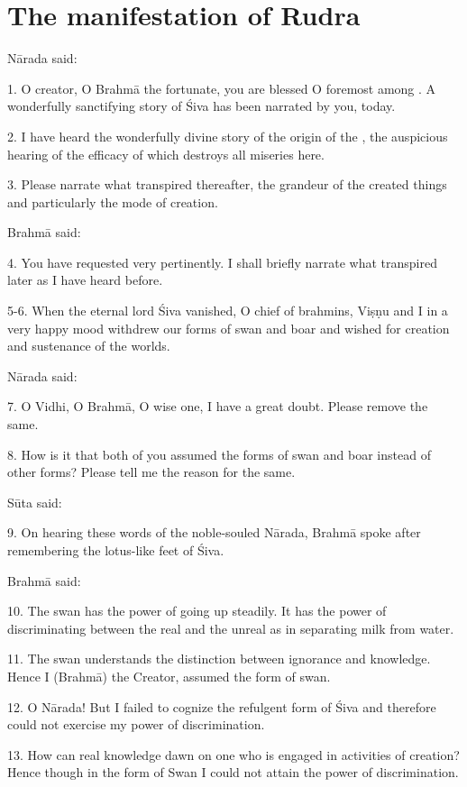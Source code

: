 \chapter{The manifestation of Rudra}

Nārada said:

1. O creator, O Brahmā the fortunate, you are blessed O foremost among .
A wonderfully sanctifying story of Śiva has been narrated by you, today.

2. I have heard the wonderfully divine story of the origin of the ,
the auspicious hearing of the efficacy of which destroys all miseries here.

3. Please narrate what transpired thereafter, the grandeur of the created things
and particularly the mode of creation.

Brahmā said:

4. You have requested very pertinently. I shall briefly narrate what transpired
later as I have heard before.

5-6. When the eternal lord Śiva vanished, O chief of brahmins, Viṣṇu and I in
a very happy mood withdrew our forms of swan and boar and wished for creation
and sustenance of the worlds.

Nārada said:

7. O Vidhi, O Brahmā, O wise one, I have a great doubt. Please remove the same.

8. How is it that both of you assumed the forms of swan and boar instead of
other forms? Please tell me the reason for the same.

Sūta said:

9. On hearing these words of the noble-souled Nārada, Brahmā spoke after
remembering the lotus-like feet of Śiva.

Brahmā said:

10. The swan has the power of going up steadily. It has the power of
discriminating between the real and the unreal as in separating milk from water.

11. The swan understands the distinction between ignorance and knowledge. Hence
I (Brahmā) the Creator, assumed the form of swan.

12. O Nārada! But I failed to cognize the refulgent form of Śiva and therefore
could not exercise my power of discrimination.

13. How can real knowledge dawn on one who is engaged in activities of creation?
Hence though in the form of Swan I could not attain the power of discrimination.


